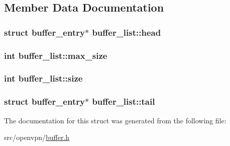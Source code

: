 \subsection{Member Data Documentation}
\hypertarget{structbuffer__list_afaecc74fd9a1fdcc9a0d707f6c8519f6}{}
\subsubsection[{head}]{\setlength{\rightskip}{0pt plus 5cm}struct {\bf buffer\+\_\+entry}$\ast$ buffer\+\_\+list\+::head}\label{structbuffer__list_afaecc74fd9a1fdcc9a0d707f6c8519f6}
\hypertarget{structbuffer__list_ad65e80969c5347f450728c8f3c149dd1}{}
\subsubsection[{max\+\_\+size}]{\setlength{\rightskip}{0pt plus 5cm}int buffer\+\_\+list\+::max\+\_\+size}\label{structbuffer__list_ad65e80969c5347f450728c8f3c149dd1}
\hypertarget{structbuffer__list_aeb4047df8b6044b88cb2c5f1803c998e}{}
\subsubsection[{size}]{\setlength{\rightskip}{0pt plus 5cm}int buffer\+\_\+list\+::size}\label{structbuffer__list_aeb4047df8b6044b88cb2c5f1803c998e}
\hypertarget{structbuffer__list_ab1d10be66880cdccbfe888d8e487d3b3}{}
\subsubsection[{tail}]{\setlength{\rightskip}{0pt plus 5cm}struct {\bf buffer\+\_\+entry}$\ast$ buffer\+\_\+list\+::tail}\label{structbuffer__list_ab1d10be66880cdccbfe888d8e487d3b3}


The documentation for this struct was generated from the following file\+:\begin{DoxyCompactItemize}
\item 
src/openvpn/\hyperlink{buffer_8h}{buffer.\+h}\end{DoxyCompactItemize}
